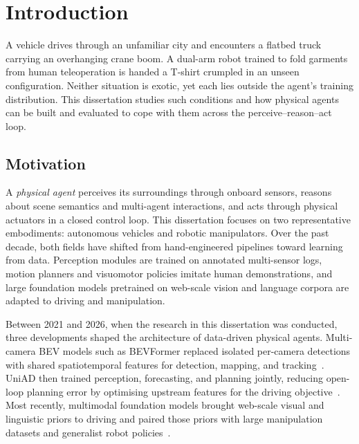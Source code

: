 \chapter{Introduction}\label{ch:intro}

A vehicle drives through an unfamiliar city and encounters a flatbed truck carrying an overhanging crane boom. A dual-arm robot trained to fold garments from human teleoperation is handed a T-shirt crumpled in an unseen configuration. Neither situation is exotic, yet each lies outside the agent's training distribution. This dissertation studies such conditions and how physical agents can be built and evaluated to cope with them across the perceive--reason--act loop.

\section{Motivation}\label{sec:intro:context}

A \emph{physical agent} perceives its surroundings through onboard sensors, reasons about scene semantics and multi-agent interactions, and acts through physical actuators in a closed control loop. This dissertation focuses on two representative embodiments: autonomous vehicles and robotic manipulators. Over the past decade, both fields have shifted from hand-engineered pipelines toward learning from data. Perception modules are trained on annotated multi-sensor logs, motion planners and visuomotor policies imitate human demonstrations, and large foundation models pretrained on web-scale vision and language corpora are adapted to driving and manipulation.

Between 2021 and 2026, when the research in this dissertation was conducted, three developments shaped the architecture of data-driven physical agents. Multi-camera BEV models such as BEVFormer replaced isolated per-camera detections with shared spatiotemporal features for detection, mapping, and tracking~\cite{li2022bevformer,li2023bevdevils}. UniAD then trained perception, forecasting, and planning jointly, reducing open-loop planning error by optimising upstream features for the driving objective~\cite{hu2023uniad}. Most recently, multimodal foundation models brought web-scale visual and linguistic priors to driving and paired those priors with large manipulation datasets and generalist robot policies~\cite{sima2024drivelm,bu2025agibot_iros,black2025pi05}.

